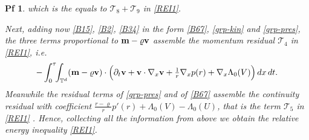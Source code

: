 \documentclass[10pt,a4paper]{amsart}
\newtheorem{pf}{Pf}
\newcommand{\Gradx}{\nabla_x}
\newcommand{\Lambdaz}{\Lambda_0}
\newcommand{\dt}{{\,\rm d} t }
\newcommand{\dx}{{\,\rm d} {x}}
\newcommand{\vc}[1]{{\bf #1}}
\newcommand{\vm}{\vc{m}}
\newcommand{\vr}{\varrho}
\newcommand{\vv}{\vc{v}}
\begin{document}
\begin{pf}
	 which is the equals to $\mathcal{T}_8+\mathcal{T}_9$ in \eqref{REI1}. \par 
	 Next, adding now \eqref{B15}, \eqref{B2}, \eqref{B34} in the form \eqref{B67}, \eqref{grp-kin} and \eqref{grp-pres}, the three terms proportional to $\vm-\vr\vv$ assemble the momentum residual $\mathcal{T}_4$ in \eqref{REI1}, i.e. 
	 \[
	 -\int_0^\tau\!\!\int_{\mathbb T^d}(\vm-\vr\vv)\cdot\Big(\partial_t\vv+\vv\cdot\Gradx\vv+\tfrac1r\Gradx p(r)+\Gradx\Lambdaz(V)\Big)\dx\dt .
	 \]
	 Meanwhile the residual terms of \eqref{grp-pres} and of \eqref{B67} assemble the continuity residual with coefficient $\tfrac{r-\vr}{r}p'(r)+\Lambdaz(V)-\Lambdaz(U)$, that is the term $\mathcal{T}_5$ in \eqref{REI1} . Hence, collecting all the information from above we obtain the relative energy inequality \eqref{REI1}.


	\end{pf}
\end{document}
